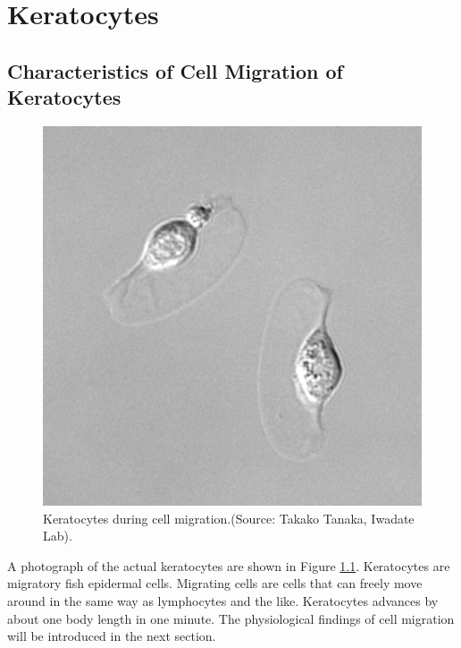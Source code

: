 \documentclass[a4paper,12pt]{book}
\begin{document}
\chapter{Keratocytes}
\section{Characteristics of Cell Migration of Keratocytes}
\begin{figure}[tbp]
\centering
\includegraphics[scale=0.4]{kera.eps}
\caption{Keratocytes during cell migration.(Source: Takako Tanaka, Iwadate Lab).}
\label{fig:kera}
\end{figure}

A photograph of the actual keratocytes are shown in Figure \ref{fig:kera}. Keratocytes are migratory fish epidermal cells. Migrating cells are cells that can freely move around in the same way as lymphocytes and the like. Keratocytes advances by about one body length in one minute. The physiological findings of cell migration will be introduced in the next section.
\end{document}
